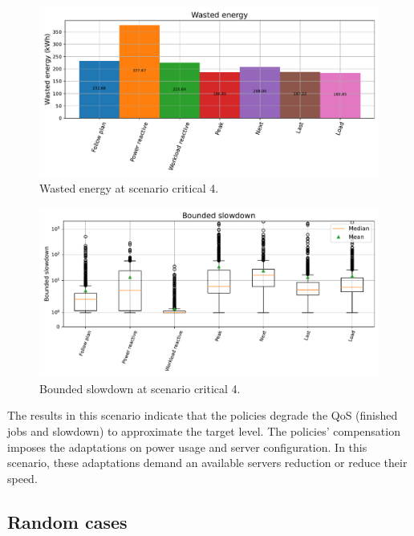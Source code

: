 \begin{figure}[!htb]
    \centering
    \includegraphics[scale=0.55]{Images/Compensations/energy_critical_4.pdf}
    \caption{Wasted energy at scenario critical 4.}
    \label{fig:energy_critical_4}
\end{figure}

\begin{figure}[!htb]
    \centering
    \includegraphics[scale=0.55]{Images/Compensations/slowdown_critical_4.pdf}
    \caption{Bounded slowdown at scenario critical 4.}
    \label{fig:slowdown_critical_4}
\end{figure}

The results in this scenario indicate that the policies degrade the QoS (finished jobs and slowdown) to approximate the target level. The policies' compensation imposes the adaptations on power usage and server configuration. In this scenario, these adaptations demand an available servers reduction or reduce their speed. 

\clearpage

\subsection{Random cases}

